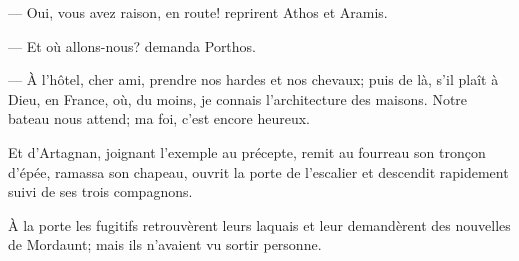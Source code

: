 — Oui, vous avez raison, en route! reprirent Athos et Aramis.

— Et où allons-nous? demanda Porthos.

— À l'hôtel, cher ami, prendre nos hardes et nos chevaux; puis de là, s'il plaît à Dieu, en France, où, du moins, je connais l'architecture des maisons. Notre bateau nous attend; ma foi, c'est encore heureux.

Et d'Artagnan, joignant l'exemple au précepte, remit au fourreau son tronçon d'épée, ramassa son chapeau, ouvrit la porte de l'escalier et descendit rapidement suivi de ses trois compagnons.

À la porte les fugitifs retrouvèrent leurs laquais et leur demandèrent des nouvelles de Mordaunt; mais ils n'avaient vu sortir personne.
